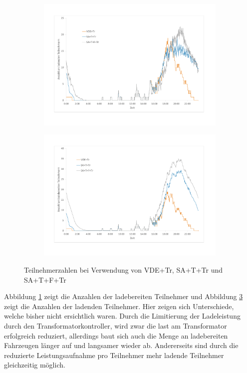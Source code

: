 \begin{figure}
	\begin{subfigure}{\linewidth}
		\includegraphics[scale=0.45]{img/mitTrafo/Teilnehmer_laden.pdf}
        \label{ABB_mT_Teil1}
	\end{subfigure}
	\begin{subfigure}{\linewidth}
		\includegraphics[scale=0.45]{img/mitTrafo/Teilnehmer_bereit.pdf}
        \label{ABB_mT_teil2}
	\end{subfigure}
	\caption{Teilnehmerzahlen bei Verwendung von VDE+Tr, SA+T+Tr und SA+T+F+Tr}
\end{figure}
Abbildung \ref{ABB_mT_Teil1} zeigt die Anzahlen der ladebereiten Teilnehmer und Abbildung \ref{ABB_mT_teil2} zeigt die Anzahlen der ladenden Teilnehmer. Hier zeigen sich Unterschiede, welche bisher nicht ersichtlich waren. Durch die Limitierung der Ladeleistung durch den Transformatorkontroller, wird zwar die last am Transformator erfolgreich reduziert, allerdings baut sich auch die Menge an ladebereiten Fahrzeugen länger auf und langsamer wieder ab. Andererseits sind durch die reduzierte Leistungsaufnahme pro Teilnehmer mehr ladende Teilnehmer gleichzeitig möglich.
